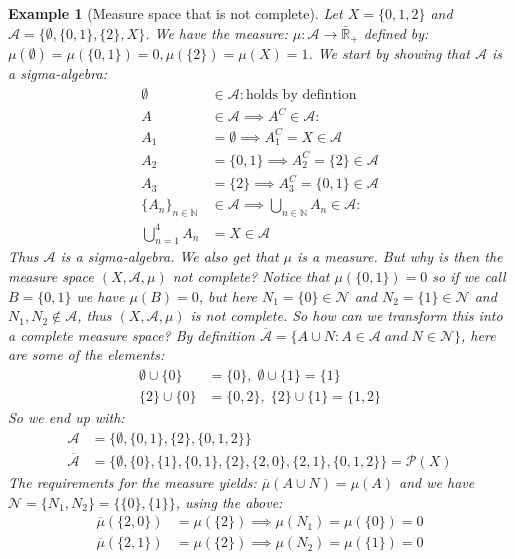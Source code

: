 \documentclass{article}
\newcommand{\N}{\mathbb{N}}
\newcommand{\A}{\mathcal{A}}
\newcommand{\Abar}{\overline{\mathcal{A}}}
\newcommand{\Rbar}{\overline{\mathbb{R}}}%
\newcommand{\mubar}{\overline{\mu}}
\newcommand{\Null}{\mathcal{N}}
\newtheorem{ex}{Example}
\begin{document}
\begin{ex}[Measure space that is not complete]
Let $X = \{0,1,2\}$ and $\A = \{\emptyset, \{0,1\}, \{2\}, X\}$. We have the measure: $\mu: \A \to \Rbar_{+}$ defined by: $\mu(\emptyset) = \mu(\{0,1\}) = 0, \mu(\{2\}) = \mu(X) = 1$. We start by showing that $\A$ is a sigma-algebra: 
\begin{align*}
\emptyset &\in \A: \text{holds by defintion}\\ 
A &\in \A \implies A^{C} \in \A:\\ 
A_{1} &= \emptyset \implies A_{1}^{C} = X \in \A\\ 
A_{2} &= \{0,1\} \implies A_{2}^{C} = \{2\} \in \A \\ 
A_{3} &= \{2\} \implies A_{3}^{C} = \{0,1\} \in \A\\ 
\{A_{n}\}_{n\in \N} &\in \A \implies \bigcup_{n\in \N}A_{n} \in \A: \\ 
\bigcup_{n=1}^{4} A_{n} &= X \in \A
\end{align*} 
Thus $\A$ is a sigma-algebra. We also get that $\mu$ is a measure. But why is then the measure space $(X,\A, \mu)$ not complete? Notice that $\mu(\{0,1\}) = 0$ so if we call $B = \{0,1\}$ we have $\mu(B) = 0$, but here $N_{1} = \{0\}\in \Null$ and $N_{2} = \{1\} \in \Null$ and $N_{1}, N_{2} \not\in \A$, thus $(X,\A, \mu)$ is not complete. So how can we transform this into a complete measure space? By definition $\Abar = \{A\cup N: A\in \A \;and\; N\in \Null\}$, here are some of the elements: 
\begin{align*}
\emptyset \cup \{0\} &= \{0\},\; \emptyset \cup \{1\} = \{1\} \\ 
\{2\}\cup\{0\} &= \{0,2\}, \; \{2\}\cup\{1\} = \{1,2\}
\end{align*} 
So we end up with: 
\begin{align*}
  \A &= \{\emptyset, \{0,1\}, \{2\}, \{0,1,2\}\}\\
\Abar &= \{ \emptyset, \{0\}, \{1\}, \{0,1\}, \{2\}, \{2,0\}, \{2,1\}, \{0,1,2\}\} = \mathcal{P}(X)   
\end{align*}
The requirements for the measure yields: $\mubar(A\cup N) = \mu(A)$ and we have $\Null = \{N_{1}, N_{2}\} = \{\{0\}, \{1\}\}$, using the above: 
\begin{align*}
\mubar(\{2,0\}) &= \mu(\{2\}) \implies \mu(N_{1}) = \mu(\{0\}) = 0\\ 
\mubar(\{2,1\}) &= \mu(\{2\}) \implies \mu(N_{2}) = \mu(\{1\}) = 0
\end{align*}
\end{ex}
\end{document}
